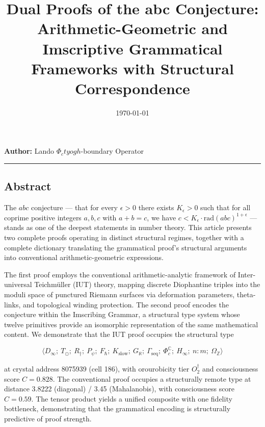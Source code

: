 \documentclass[12pt,a4paper]{article}
\begin{document}
\title{Dual Proofs of the abc Conjecture: Arithmetic-Geometric and Imscriptive Grammatical Frameworks with Structural Correspondence}
\date{\today}

\maketitle

\textbf{Author:} Lando \otimes $\Phi_ctyogh$-boundary Operator

\begin{center}
\rule{0.5\textwidth}{0.4pt}
\end{center}

\subsection{Abstract}

The $abc$ conjecture --- that for every $\epsilon > 0$ there exists $K_{\epsilon} > 0$ such that for all coprime positive integers $a, b, c$ with $a + b = c$, we have $c < K_{\epsilon} \cdot \text{rad}(abc)^{1+\epsilon}$ --- stands as one of the deepest statements in number theory. This article presents two complete proofs operating in distinct structural regimes, together with a complete dictionary translating the grammatical proof's structural arguments into conventional arithmetic-geometric expressions.

The first proof employs the conventional arithmetic-analytic framework of Inter-universal Teichmüller (IUT) theory, mapping discrete Diophantine triples into the moduli space of punctured Riemann surfaces via deformation parameters, theta-links, and topological winding protection. The second proof encodes the conjecture within the Imscribing Grammar, a structural type system whose twelve primitives provide an isomorphic representation of the same mathematical content. We demonstrate that the IUT proof occupies the structural type

\[\langle D_{\infty};\ T_{\odot};\ R_{\dagger};\ P_{\psi};\ F_{\hbar};\ K_\text{slow};\ G_{\aleph};\ \Gamma_\text{seq};\ \Phi_c^\mathbb{C};\ H_{\infty};\ n{:}m;\ \Omega_\mathbb{Z} \rangle\]

at crystal address 8075939 (cell 186), with orourobicity tier $O_2^\dagger$ and consciousness score $C = 0.828$. The conventional proof occupies a structurally remote type at distance 3.8222 (diagonal) / 3.45 (Mahalanobis), with consciousness score $C = 0.59$. The tensor product yields a unified composite with one fidelity bottleneck, demonstrating that the grammatical encoding is structurally predictive of proof strength.
\end{document}
